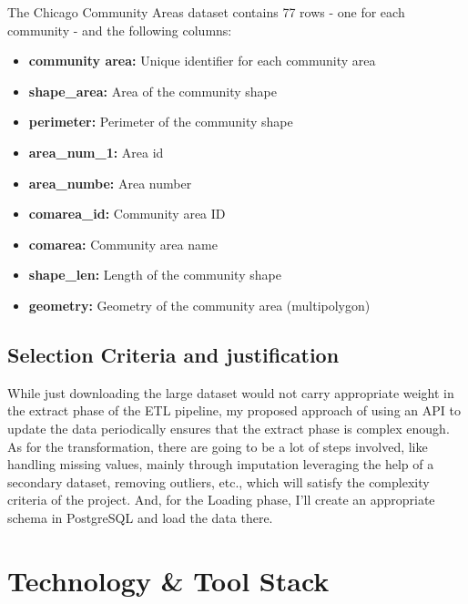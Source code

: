 \documentclass{article}
\begin{document}
\noindent The Chicago Community Areas dataset contains 77 rows - one for each community - and the following columns:
\begin{itemize}[leftmargin=2em]
    \item \textbf{community area:} Unique identifier for each community area
    \item \textbf{shape\_area:} Area of the community shape
    \item \textbf{perimeter:} Perimeter of the community shape
    \item \textbf{area\_num\_1:} Area id
    \item \textbf{area\_numbe:} Area number
    \item \textbf{comarea\_id:} Community area ID
    \item \textbf{comarea:} Community area name
    \item \textbf{shape\_len:} Length of the community shape
    \item \textbf{geometry:} Geometry of the community area (multipolygon)
\end{itemize}


\subsection{Selection Criteria and justification}
While just downloading the large dataset would not carry appropriate weight in the extract phase of the ETL pipeline, my proposed approach of using an API to update the data periodically ensures that the extract phase is complex enough. As for the transformation, there are going to be a lot of steps involved, like handling missing values, mainly through imputation leveraging the help of a secondary dataset, removing outliers, etc., which will satisfy the complexity criteria of the project. And, for the Loading phase, I’ll create an appropriate schema in PostgreSQL and load the data there. 


\section{Technology \& Tool Stack}
\end{document}
